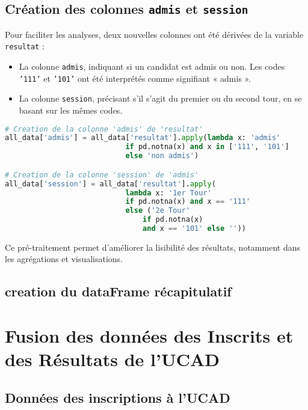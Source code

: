 \newpage
\subsection{Création des colonnes \texttt{admis} et \texttt{session}}

Pour faciliter les analyses, deux nouvelles colonnes ont été dérivées de la variable \texttt{resultat} :
\begin{itemize}
\item La colonne \texttt{admis}, indiquant si un candidat est admis ou non. Les codes \texttt{'111'} et \texttt{'101'} ont été interprétés comme signifiant « admis ».
\item La colonne \texttt{session}, précisant s’il s’agit du premier ou du second tour, en se basant sur les mêmes codes.
\end{itemize}

\begin{lstlisting}[language=Python,
    caption=Création de nouvelles colonnes,
    label=lst:creation_colonnes,
    basicstyle=\ttfamily\small,
    backgroundcolor=\color{gray!10}
]
# Creation de la colonne 'admis' de 'resultat'
all_data['admis'] = all_data['resultat'].apply(lambda x: 'admis' 
                            if pd.notna(x) and x in ['111', '101'] 
                            else 'non admis')

# Creation de la colonne 'session' de 'admis'
all_data['session'] = all_data['resultat'].apply(
                            lambda x: '1er Tour' 
                            if pd.notna(x) and x == '111' 
                            else ('2e Tour' 
                                if pd.notna(x) 
                                and x == '101' else ''))
\end{lstlisting}

Ce pré-traitement permet d’améliorer la lisibilité des résultats, notamment dans les agrégations et visualisations.

\subsection{creation du dataFrame récapitulatif}

\newpage
\section{Fusion des données des Inscrits et des Résultats de l’UCAD}

\subsection{Données des inscriptions à l’UCAD}

